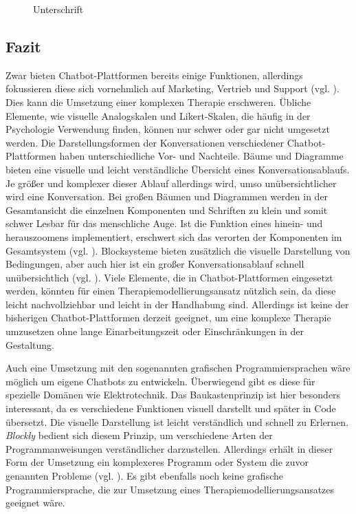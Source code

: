 \begin{figure}[h]
\centering
{}
\caption{Unterschrift}
\label{expSa}
\end{figure}

\subsection{Fazit}

Zwar bieten Chatbot-Plattformen bereits einige Funktionen, allerdings fokussieren diese sich vornehmlich auf Marketing, Vertrieb und Support (vgl. \cite{Chatfuel3:online} \cite{Converse15:online} \cite{ManyChat78:online}). Dies kann die Umsetzung einer komplexen Therapie erschweren. Übliche Elemente, wie visuelle Analogskalen und Likert-Skalen, die häufig in der Psychologie Verwendung finden, können nur schwer oder gar nicht umgesetzt werden. Die Darstellungsformen der Konversationen verschiedener Chatbot-Plattformen haben unterschiedliche Vor- und Nachteile. Bäume und Diagramme bieten eine visuelle und leicht verständliche Übersicht eines Konversationsablaufs. Je größer und komplexer dieser Ablauf allerdings wird, umso unübersichtlicher wird eine Konversation. Bei großen Bäumen und Diagrammen werden in der Gesamtansicht die einzelnen Komponenten und Schriften zu klein und somit schwer Lesbar für das menschliche Auge. Ist die Funktion eines hinein- und herauszoomens implementiert, erschwert sich das verorten der Komponenten im Gesamtsystem (vgl. \cite{Hornbaek2003}). Blocksysteme bieten zusätzlich die visuelle Darstellung von Bedingungen, aber auch hier ist ein großer Konversationsablauf schnell unübersichtlich (vgl. \cite{Hornbaek2003}). Viele Elemente, die in Chatbot-Plattformen eingesetzt werden, könnten für einen Therapiemodellierungsansatz nützlich sein, da diese leicht nachvollziehbar und leicht in der Handhabung sind. Allerdings ist keine der bisherigen Chatbot-Plattformen derzeit geeignet, um eine komplexe Therapie umzusetzen ohne lange Einarbeitungszeit oder Einschränkungen in der Gestaltung. 

Auch eine Umsetzung mit den sogenannten grafischen Programmiersprachen wäre möglich um eigene Chatbots zu entwickeln. Überwiegend gibt es diese für spezielle Domänen wie Elektrotechnik. Das Baukastenprinzip ist hier besonders interessant, da es verschiedene Funktionen visuell darstellt und später in Code übersetzt. Die visuelle Darstellung ist leicht verständlich und schnell zu Erlernen. \emph{Blockly} bedient sich diesem Prinzip, um verschiedene Arten der Programmanweisungen verständlicher darzustellen. Allerdings erhält in dieser Form der Umsetzung ein komplexeres Programm oder System die zuvor genannten Probleme (vgl. \cite{Hornbaek2003}). Es gibt ebenfalls noch keine grafische Programmiersprache, die zur Umsetzung eines Therapiemodellierungsansatzes geeignet wäre. 

